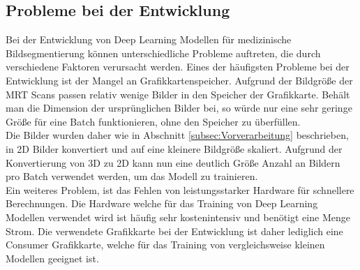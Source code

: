 \subsection{Probleme bei der Entwicklung}
Bei der Entwicklung von Deep Learning \gls{Modell}en für medizinische Bildsegmentierung können unterschiedliche Probleme auftreten, die durch verschiedene Faktoren verursacht werden. Eines der häufigsten Probleme bei der Entwicklung ist der Mangel an Grafikkartenspeicher. Aufgrund der  Bildgröße der \ac{MRT} Scans passen relativ wenige Bilder in den Speicher der Grafikkarte. Behält man die Dimension der ursprünglichen Bilder bei, so würde nur eine sehr geringe Größe für eine Batch funktionieren, ohne den Speicher zu überfüllen. \\
Die Bilder wurden daher wie in Abschnitt \ref{subsec:Vorverarbeitung} beschrieben, in 2D Bilder konvertiert und auf eine kleinere Bildgröße skaliert. Aufgrund der Konvertierung von 3D zu 2D kann nun eine deutlich Größe Anzahl an Bildern pro Batch verwendet werden, um das \gls{Modell} zu trainieren.\\
Ein weiteres Problem, ist das Fehlen von leistungsstarker Hardware für schnellere Berechnungen. Die Hardware welche für das Training von Deep Learning \gls{Modell}en verwendet wird ist häufig sehr kostenintensiv und benötigt eine Menge Strom. Die verwendete Grafikkarte bei der Entwicklung ist daher lediglich eine Consumer Grafikkarte, welche für das Training von vergleichsweise kleinen \gls{Modell}en geeignet ist.

